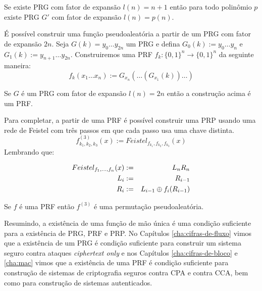 \begin{theorem}
  Se existe PRG com fator de expansão $l(n) = n + 1$ então para todo polinômio $p$ existe PRG $G'$ com fator de expansão $l(n) = p(n)$.
\end{theorem}

  
É possível construir uma função pseudoaleatória a partir de um PRG com fator de expansão $2n$.
Seja $G(k) = y_0 \dots y_{2n}$ um PRG e defina $G_0(k) := y_0 \dots y_n$ e $G_1(k) := y_{n+1} \dots y_{2n}$.
Construiremos uma PRF $f_k: \{0,1\}^n \to \{0,1\}^n$ da seguinte maneira:
\begin{displaymath}
  f_k(x_1 \dots x_n) := G_{x_n}(\dots (G_{x_1}(k))\dots)
\end{displaymath}

\begin{theorem}
  Se $G$ é um PRG com fator de expansão $l(n) = 2n$ então a construção acima é um PRF.  
\end{theorem}


Para completar, a partir de uma PRF é possível construir uma PRP usando uma rede de Feistel com três passos em que cada passo usa uma chave distinta.
\begin{displaymath}
  f_{k_1,k_2,k_3}^{(3)}(x) := Feistel_{f_{k_1},f_{k_2},f_{k_3}}(x)
\end{displaymath}
Lembrando que:

\begin{eqnarray*}
  Feistel_{f_1,\dots,f_n}(x) & := & L_nR_n\\
  L_i & := & R_{i-1}\\
  R_i & := & L_{i-1} \oplus f_i(R_{i-1})
\end{eqnarray*}


\begin{theorem}
  Se $f$ é uma PRF então $f^{(3)}$ é uma permutação pseudoaleatória.
\end{theorem}


Resumindo, a existência de uma função de mão única é uma condição suficiente para a existência de PRG, PRF e PRP.
No Capítulos \ref{cha:cifras-de-fluxo} vimos que a existência de um PRG é condição suficiente para construir um sistema seguro contra ataques {\em ciphertext only} e nos Capítulos \ref{cha:cifras-de-bloco} e \ref{cha:mac} vimos que a existência de uma PRF é condição suficiente para construção de sistemas de criptografia seguros contra CPA e contra CCA, bem como para construção de sistemas autenticados.


